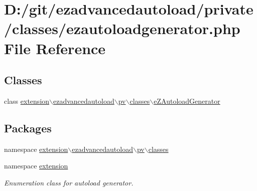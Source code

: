 \hypertarget{ezautoloadgenerator_8php}{\section{\-D\-:/git/ezadvancedautoload/private/classes/ezautoloadgenerator.php \-File \-Reference}
\label{ezautoloadgenerator_8php}
}
\subsection*{\-Classes}
\begin{DoxyCompactItemize}
\item 
class \hyperlink{classextension_1_1ezadvancedautoload_1_1pv_1_1classes_1_1e_z_autoload_generator}{extension$\backslash$ezadvancedautoload$\backslash$pv$\backslash$classes$\backslash$e\-Z\-Autoload\-Generator}
\end{DoxyCompactItemize}
\subsection*{\-Packages}
\begin{DoxyCompactItemize}
\item 
namespace \hyperlink{namespaceextension_1_1ezadvancedautoload_1_1pv_1_1classes}{extension$\backslash$ezadvancedautoload$\backslash$pv$\backslash$classes}
\item 
namespace \hyperlink{namespaceextension}{extension}
\begin{DoxyCompactList}\small\item\em \-Enumeration class for autoload generator. \end{DoxyCompactList}\end{DoxyCompactItemize}
